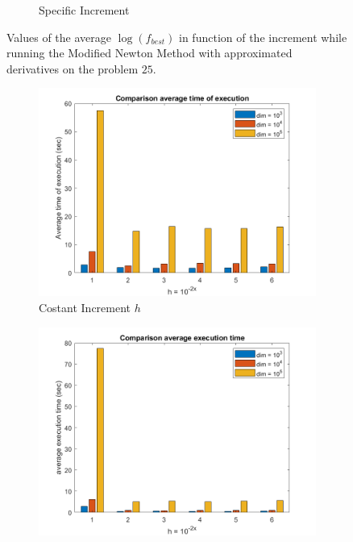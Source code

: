 \begin{figure}[htbp]
\begin{subfigure}[t]{0.45\textwidth}
        \caption{Specific Increment }
    \end{subfigure}
    \caption{ \small Values of the average $\log(f_{best})$ in function of the increment while running the Modified Newton Method with approximated derivatives on the problem $25$.}
    \label{logfbest_difffinite25}
\end{figure}


\begin{figure}[htbp]
    \centering
    \begin{subfigure}[t]{0.45\textwidth}  %
        \centering
        \includegraphics[width=\textwidth]{img/pb25_MN_difffinite_COST_timeofexec.png}
        \caption{Costant Increment $h$}
    \end{subfigure}
    \hspace{1cm} %
    \begin{subfigure}[t]{0.45\textwidth}
        \centering
        \includegraphics[width=\textwidth]{img/pb25_MN_difffinite_REL_timeofexec.png}

\end{subfigure}
\end{figure}
